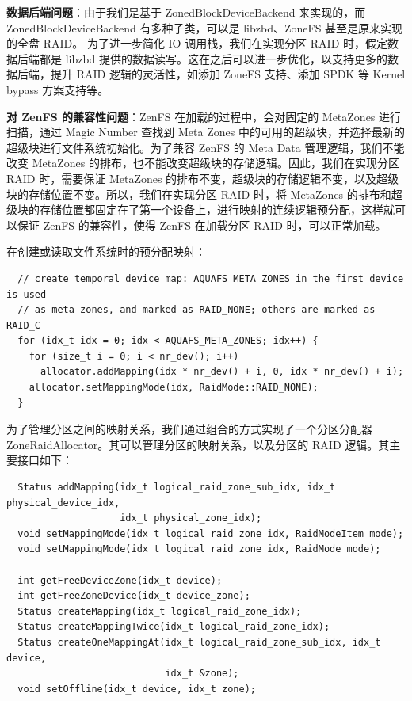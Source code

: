 \textbf{数据后端问题}：由于我们是基于 ZonedBlockDeviceBackend 来实现的，而 ZonedBlockDeviceBackend 有多种子类，可以是 libzbd、ZoneFS 甚至是原来实现的全盘 RAID。
为了进一步简化 IO 调用栈，我们在实现分区 RAID 时，假定数据后端都是 libzbd 提供的数据读写。这在之后可以进一步优化，以支持更多的数据后端，提升 RAID 逻辑的灵活性，如添加 ZoneFS 支持、添加 SPDK 等 Kernel bypass 方案支持等。

\textbf{对 ZenFS 的兼容性问题}：ZenFS 在加载的过程中，会对固定的 MetaZones 进行扫描，通过 Magic Number 查找到 Meta Zones 中的可用的超级块，并选择最新的超级块进行文件系统初始化。为了兼容 ZenFS 的 Meta Data 管理逻辑，我们不能改变 MetaZones 的排布，也不能改变超级块的存储逻辑。因此，我们在实现分区 RAID 时，需要保证 MetaZones 的排布不变，超级块的存储逻辑不变，以及超级块的存储位置不变。所以，我们在实现分区 RAID 时，将 MetaZones 的排布和超级块的存储位置都固定在了第一个设备上，进行映射的连续逻辑预分配，这样就可以保证 ZenFS 的兼容性，使得 ZenFS 在加载分区 RAID 时，可以正常加载。

在创建或读取文件系统时的预分配映射：

\begin{lstlisting}
  // create temporal device map: AQUAFS_META_ZONES in the first device is used
  // as meta zones, and marked as RAID_NONE; others are marked as RAID_C
  for (idx_t idx = 0; idx < AQUAFS_META_ZONES; idx++) {
    for (size_t i = 0; i < nr_dev(); i++)
      allocator.addMapping(idx * nr_dev() + i, 0, idx * nr_dev() + i);
    allocator.setMappingMode(idx, RaidMode::RAID_NONE);
  }
\end{lstlisting}

为了管理分区之间的映射关系，我们通过组合的方式实现了一个分区分配器 ZoneRaidAllocator。其可以管理分区的映射关系，以及分区的 RAID 逻辑。其主要接口如下：

\begin{lstlisting}
  Status addMapping(idx_t logical_raid_zone_sub_idx, idx_t physical_device_idx,
                    idx_t physical_zone_idx);
  void setMappingMode(idx_t logical_raid_zone_idx, RaidModeItem mode);
  void setMappingMode(idx_t logical_raid_zone_idx, RaidMode mode);

  int getFreeDeviceZone(idx_t device);
  int getFreeZoneDevice(idx_t device_zone);
  Status createMapping(idx_t logical_raid_zone_idx);
  Status createMappingTwice(idx_t logical_raid_zone_idx);
  Status createOneMappingAt(idx_t logical_raid_zone_sub_idx, idx_t device,
                            idx_t &zone);
  void setOffline(idx_t device, idx_t zone);
\end{lstlisting}

